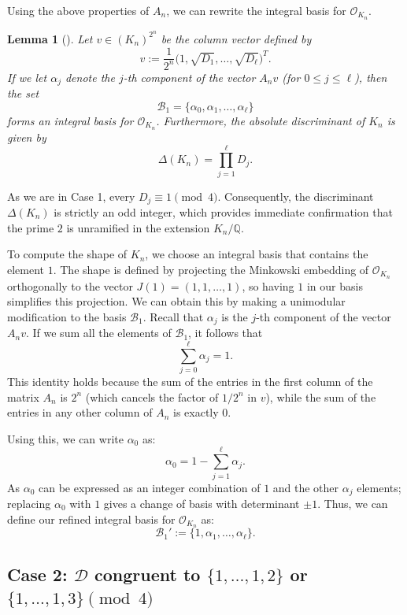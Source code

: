 \documentclass{amsart}
\newcommand{\Q}{\mathbb{Q}}
\theoremstyle{plain}
\newtheorem{lemma}[theorem]{Lemma}
\theoremstyle{definition}
\theoremstyle{remark}
\numberwithin{equation}{section}
\begin{document}
Using the above properties of $A_n$, we can rewrite the integral basis for $\mathcal{O}_{K_n}$.

\begin{lemma}[{\cite[Th\'{e}or\`{e}me 1(b)]{Chatelain}}] \label{lem:integral_basis_case1}
    Let $v \in (K_n)^{2^n}$ be the column vector defined by 
    \[ 
        v := \frac{1}{2^n}\bigl(1, \sqrt{D_1}, \ldots, \sqrt{D_{\ell}}\bigr)^T. 
    \]
    If we let $\alpha_j$ denote the $j$-th component of the vector $A_n v$ (for $0 \leq j \leq \ell$), then the set 
    \[ 
        \mathcal{B}_1 = \{\alpha_0, \alpha_1, \ldots, \alpha_{\ell}\} 
    \] 
    forms an integral basis for $\mathcal{O}_{K_n}$. Furthermore, the absolute discriminant of $K_n$ is given by
    \[ 
        \Delta(K_n) = \prod_{j=1}^{\ell} D_j. 
    \]
\end{lemma}

As we are in Case 1, every $D_j \equiv 1 \pmod 4$. Consequently, the discriminant $\Delta(K_n)$ is strictly an odd integer, which provides immediate confirmation that the prime $2$ is unramified in the extension $K_n/\Q$.

To compute the shape of $K_n$, we choose an integral basis that contains the element $1$. The shape is defined by projecting the Minkowski embedding of $\mathcal{O}_{K_n}$ orthogonally to the vector $J(1) = (1, 1, \ldots, 1)$, so having $1$ in our basis  simplifies this projection. We can obtain this by making a unimodular modification to the basis $\mathcal{B}_1$. Recall that $\alpha_j$ is the $j$-th component of the vector $A_n v$. If we sum all the elements of $\mathcal{B}_1$, it follows that
\[
    \sum_{j=0}^{\ell} \alpha_j = 1.
\]
This identity holds because the sum of the entries in the first column of the matrix $A_n$ is $2^n$ (which cancels the factor of $1/2^n$ in $v$), while the sum of the entries in any other column of $A_n$ is exactly $0$. 

Using this, we can write $\alpha_0$ as:
\[
    \alpha_0 = 1 - \sum_{j=1}^{\ell} \alpha_j.
\]
As $\alpha_0$ can be expressed as an integer combination of $1$ and the other $\alpha_j$ elements; replacing $\alpha_0$ with $1$ gives a change of basis with determinant $\pm 1$. Thus, we can define our refined integral basis for $\mathcal{O}_{K_n}$ as:
\[
    \mathcal{B}_1' := \{1, \alpha_1, \ldots, \alpha_{\ell}\}.
\]


\subsection*{Case 2: \texorpdfstring{$\mathcal{D}$ congruent to $\{1, \ldots, 1, 2\}$ or $\{1, \ldots, 1, 3\} \pmod 4$}{Case 2}}
\end{document}
